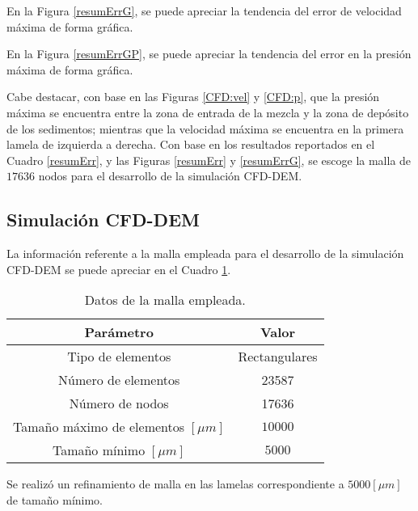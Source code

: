 En la Figura \ref{resumErrG}, se puede apreciar la tendencia del error de velocidad m\'axima de forma gr\'afica.



\noindent
\justify

En la Figura \ref{resumErrGP}, se puede apreciar la tendencia del error en la presi\'on m\'axima de forma gr\'afica.



\noindent
\justify

Cabe destacar, con base en las Figuras \ref{CFD:vel} y \ref{CFD:p}, que la presi\'on m\'axima se encuentra entre la zona de entrada de la mezcla y la zona de dep\'osito de los sedimentos; mientras que la velocidad m\'axima se encuentra en la primera lamela de izquierda a derecha. Con base en los resultados reportados en el Cuadro \ref{resumErr}, y las Figuras \ref{resumErr} y \ref{resumErrG}, se escoge la malla de $17636$ nodos para el desarrollo de la simulaci\'on CFD-DEM.

\subsection{Simulaci\'on CFD-DEM}

\noindent
\justify

La informaci\'on referente a la malla empleada para el desarrollo de la simulaci\'on CFD-DEM se puede apreciar en el Cuadro \ref{mallaF}.

\begin{table}[h!]
	\centering
	\begin{tabular}{|c|c|}
		\hline
		\textbf{Par\'ametro} & \textbf{Valor} \\ \hline
		Tipo de elementos & Rectangulares \\ \hline
		N\'umero de elementos & 23587 \\ \hline
		N\'umero de nodos & 17636 \\ \hline
		Tama\~no m\'aximo de elementos $[\mu m]$ & $10000$ \\ \hline
		Tama\~no m\'inimo $[\mu m]$ & $5000$ \\ \hline	
	\end{tabular}
	\caption{Datos de la malla empleada.}
	\label{mallaF}
\end{table}

\noindent
\justify

Se realiz\'o un refinamiento de malla en las lamelas correspondiente a $5000 [\mu m]$ de tama\~no m\'inimo. 

